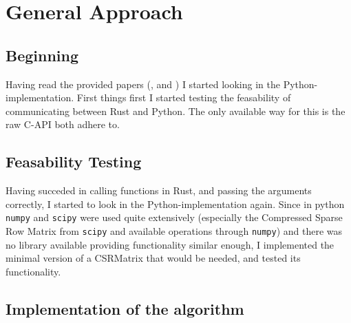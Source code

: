 
\newpage
\section{General Approach}\label{sec:approach}




\subsection{Beginning}


Having read the provided papers (\cite{imakaev2012iterative},
\cite{lieberman2009comprehensive} and \cite{wingett2015hicup}) I started
looking in the Python-implementation. First things first I started testing the
feasability of communicating between Rust and Python. The only available way
for this is the raw C-API both adhere to.

\subsection{Feasability Testing}


Having succeded in calling functions in Rust, and passing the arguments
correctly, I started to look in the Python-implementation again. Since in
python \verb|numpy| and \verb|scipy| were used quite extensively (especially
the Compressed Sparse Row Matrix from \verb|scipy| and available operations
through \verb|numpy|) and there was no library available providing
functionality similar enough, I implemented the minimal version of a CSRMatrix
that would be needed, and tested its functionality.


\subsection{Implementation of the algorithm}


